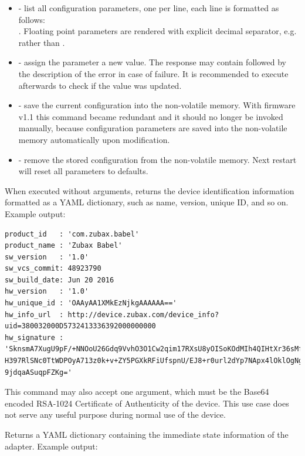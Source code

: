 \documentclass{zubaxdoc}
\begin{document}
\begin{itemize}
\item {} - list all configuration parameters, one per line, each line is formatted as follows:\\ . Floating point parameters are rendered with explicit decimal separator, e.g.   rather than .
\item {} - assign the parameter a new value. The response may contain  followed by the description of the error in case of failure. It is recommended to execute  afterwards to check if the value was updated.
\item {} - save the current configuration into the non-volatile memory. With firmware v1.1 this command became redundant and it should no longer be invoked manually,  because configuration parameters are saved into the non-volatile memory automatically upon modification.
\item {} - remove the stored configuration from the non-volatile memory. Next restart will reset all parameters to defaults.
\end{itemize}


When executed without arguments, returns the device identification information formatted as a YAML dictionary, such as name, version, unique ID, and so on. Example output:

\begin{verbatim}
product_id   : 'com.zubax.babel'
product_name : 'Zubax Babel'
sw_version   : '1.0'
sw_vcs_commit: 48923790
sw_build_date: Jun 20 2016
hw_version   : '1.0'
hw_unique_id : 'OAAyAA1XMkEzNjkgAAAAAA=='
hw_info_url  : http://device.zubax.com/device_info?uid=380032000D5732413336392000000000
hw_signature : 'SknsmA7XugU9pF/+NNOoU26Gdq9VvhO3O1Cw2qim17RXsU8yOISoKOdMIh4QIHtXr36sMfx
H397RlSNc0TtWDPOyA713z0k+v+ZY5PGXkRFiUfspnU/EJ8+r0url2dYp7NApx4lOklOgNgHrGCA6lPxA8UqoW
9jdqaASuqpFZKg='
\end{verbatim}

This command may also accept one argument, which must be the Base64 encoded RSA-1024 Certificate of Authenticity of the device. This use case does not serve any useful purpose during normal use of the device.
\clearpage


Returns a YAML dictionary containing the immediate state information of the adapter. Example output:
\end{document}
